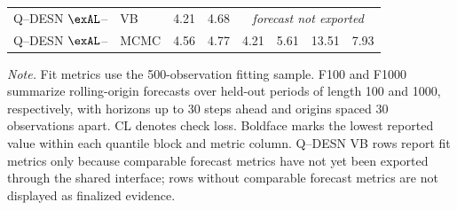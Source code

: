 \begin{table}[H]
\begin{tabular}{@{}llrrrrrr@{}}
Q--DESN \(\exAL\)--\RHS{} & VB & 4.21 & 4.68 & \multicolumn{4}{c}{\emph{forecast not exported}} \\
Q--DESN \(\exAL\)--\RHS{} & MCMC & 4.56 & 4.77 & 4.21 & 5.61 & 13.51 & 7.93 \\
\bottomrule
\end{tabular}
\par\vspace{0.35em}
\begin{minipage}{0.97\textwidth}\footnotesize
\emph{Note.} Fit metrics use the 500-observation fitting sample. F100 and F1000 summarize rolling-origin forecasts over held-out periods of length 100 and 1000, respectively, with horizons up to 30 steps ahead and origins spaced 30 observations apart. CL denotes check loss. Boldface marks the lowest reported value within each quantile block and metric column. Q--DESN VB rows report fit metrics only because comparable forecast metrics have not yet been exported through the shared interface; rows without comparable forecast metrics are not displayed as finalized evidence.
\end{minipage}
\end{table}

